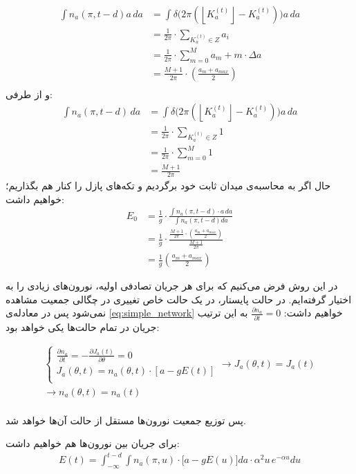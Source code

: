 \documentclass[12pt,onecolumn,a4paper]{article}
\newcommand{\floor}[1]{\left\lfloor #1 \right\rfloor}
\begin{document}
\begin{align}
\int n_a(\pi,t-d)a\,da &= \int \delta \bigg( 2\pi ( \floor{K^{(t)}_a} - K^{(t)}_a) \bigg) a\,da\\
&= \frac{1}{2\pi} \cdot \sum_{K^{(t)}_a \in Z} a_i \\
&= \frac{1}{2\pi} \cdot \sum^{M}_{m=0} a_m + m \cdot \Delta a\\
&= \frac{M+1}{2\pi} \cdot ( \frac{a_m +a_{max} }{2} )\\
\end{align}
و از طرفی:
\begin{align}
\int n_a(\pi,t-d)\,da &= \int \delta \bigg( 2\pi ( \floor{K^{(t)}_a} - K^{(t)}_a) \bigg) a\,da\\
&= \frac{1}{2\pi} \cdot \sum_{K^{(t)}_a \in Z} 1 \\
&= \frac{1}{2\pi} \cdot \sum^{M}_{m=0}  1\\
&= \frac{M+1}{2\pi}
\end{align}
حال اگر به محاسبه‌ی میدان ثابت خود برگردیم و تکه‌های پازل را کنار هم بگذاریم؛ خواهیم داشت:
\begin{align}
E_0 &= \frac{1}{g}\cdot \frac{\int n_a(\pi,t-d)\cdot a\,da}{\int n_a(\pi,t-d) da } \\
&= \frac{1}{g}\cdot \frac{ \frac{M+1}{2\pi} \cdot ( \frac{a_m +a_{max} }{2} ) }{ \frac{M+1}{2\pi} } \\
&= \frac{1}{g} ( \frac{a_m +a_{max} }{2} )
\end{align}

در این روش فرض می‌کنیم که برای هر جریان تصادفی اولیه، نورون‌های زیادی را به اختیار گرفته‌ایم. در حالت پایستار، در یک حالت خاص تغییری در چگالی جمعیت مشاهده نمی‌شود پس در معادله‌ی
\ref{eq:simple_network}
خواهیم داشت:
$\frac{\partial n_a}{\partial t} = 0 $
به این ترتیب جریان در تمام حالت‌ها یکی خواهد بود:

\begin{align}
\begin{cases}
\frac{\partial n_a}{\partial t} = - \frac{\partial J_{a}(t)}{\partial \theta} = 0\\
J_{a}(\theta, t) = n_a(\theta,t) \cdot [ a - g E(t) ]\\
\end{cases}
\rightarrow J_{a}(\theta, t) = J_{a}(t)\\
\rightarrow n_{a}(\theta, t) = n_{a}(t)\\
\end{align}

پس توزیع جمعیت نورون‌‌ها مستقل از حالت آن‌ها خواهد شد.


برای جریان بین نورون‌ها هم خواهیم داشت:
\begin{align}
E(t) = \int_{- \infty}^{t - d} \int n_a(\pi,u) \cdot \big[ a - g E(u) \big] da \cdot \alpha^2 u\, e^{-\alpha u} du \\
\end{align}

\newpage


\end{document}
